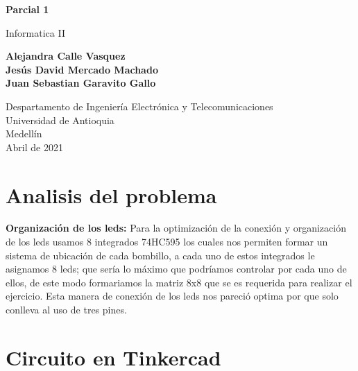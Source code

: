 \documentclass{article}
\begin{document}
\begin{titlepage}
    \begin{center}
        \vspace*{1cm}
            
        \Huge
        \textbf{Parcial 1}
            
        \vspace{0.5cm}
        \LARGE
        Informatica II
            
        \vspace{2.5cm}
            
        \textbf{Alejandra Calle Vasquez\\
                Jesús David Mercado Machado \\
                Juan Sebastian Garavito Gallo}
            
        \vfill
            
        \vspace{0.7cm}
            
        \Large
        Despartamento de Ingeniería Electrónica y Telecomunicaciones\\
        Universidad de Antioquia\\
        Medellín\\
        Abril de 2021
            
    \end{center}
\end{titlepage}

\tableofcontents
\newpage
\section{Analisis del problema}\label{intro}
\textbf{Organización de los leds: }
Para la optimización de la conexión y organización de los leds usamos 8 integrados 74HC595 los cuales nos permiten formar un sistema de ubicación de cada bombillo, a cada uno de estos integrados le asignamos 8 leds; que sería lo máximo que podríamos controlar por cada uno de ellos, de este modo formariamos la matriz 8x8 que se es requerida para realizar el ejercicio. Esta manera de conexión de los leds nos pareció optima por que solo conlleva al uso de tres pines.

\section{Circuito en Tinkercad} \label{imagenes}
\end{document}
